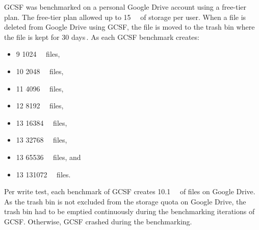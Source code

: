 \gls{GCSF} was benchmarked on a personal Google Drive account using a \mbox{free-tier} plan. The \mbox{free-tier} plan allowed up to \SI[per-mode = symbol]{15}{\giga\byte} of storage per user. When a file is deleted from Google Drive using \gls{GCSF}, the file is moved to the trash bin where the file is kept for 30 days\,\cite{googleDeleteRestoreFiles}. As each \gls{GCSF} benchmark creates:
\begin{itemize}
	\item 9 \SI[per-mode = symbol]{1024}{\kilo\byte} files,
	\item 10 \SI[per-mode = symbol]{2048}{\kilo\byte} files,
	\item 11 \SI[per-mode = symbol]{4096}{\kilo\byte} files,
	\item 12 \SI[per-mode = symbol]{8192}{\kilo\byte} files,
	\item 13 \SI[per-mode = symbol]{16384}{\kilo\byte} files,
	\item 13 \SI[per-mode = symbol]{32768}{\kilo\byte} files,
	\item 13 \SI[per-mode = symbol]{65536}{\kilo\byte} files, and
	\item 13 \SI[per-mode = symbol]{131072}{\kilo\byte} files.
\end{itemize}
Per write test, each benchmark of \gls{GCSF} creates \SI[per-mode = symbol]{10.1}{\giga\byte} of files on Google Drive. As the trash bin is not excluded from the storage quota on Google Drive, the trash bin had to be emptied continuously during the benchmarking iterations of \gls{GCSF}. Otherwise, \gls{GCSF} crashed during the benchmarking.


